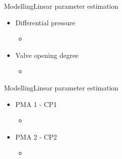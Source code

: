 \begin{frame}{Modelling}{Linear parameter estimation}
\begin{itemize}
	\item<1-> Differential pressure 
	\begin{itemize}
		\item<1->[] 
			\begin{figure}[H]
			\centering
			 
			\end{figure}	
	\end{itemize}	
\end{itemize}

\begin{itemize}
	\item<1-> Valve opening degree
	\begin{itemize}
		\item<1->[] 
			\begin{figure}[H]
			\centering
			 
			\end{figure}	
	\end{itemize}	
\end{itemize}
\end{frame}

\begin{frame}{Modelling}{Linear parameter estimation}
\begin{itemize}
	\item<1-> PMA 1 - CP1
	\begin{itemize}
		\item<1->[] 
			\begin{figure}[H]
			\centering
			 
			\end{figure}	
	\end{itemize}	
\end{itemize}

\begin{itemize}
	\item<1-> PMA 2 - CP2
	\begin{itemize}
		\item<1->[] 
			\begin{figure}[H]
			\centering
			 
			\end{figure}	
	\end{itemize}	
\end{itemize}
\end{frame}

